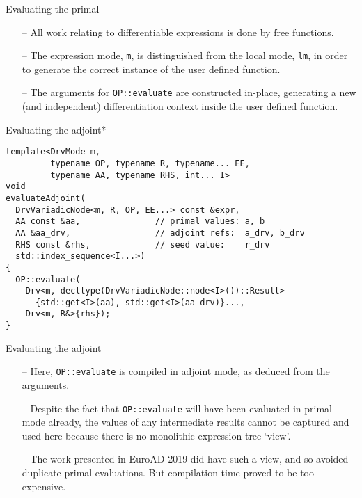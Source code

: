 \documentclass[xcolor=dvipsnames]{beamer}
\begin{document}
\begin{frame}[fragile]{Evaluating the primal}
\begin{itemize}
\item[--] All work relating to differentiable expressions is done by free functions.\vspace{3mm}
\item[--] The expression mode, \texttt{m}, is distinguished from the local mode, \texttt{lm}, in order to generate the correct instance of the user defined function. \vspace{3mm}
\item[--] The arguments for \texttt{OP::evaluate} are constructed in-place, generating a new (and independent) differentiation context inside the user defined function.  \vspace{3mm}
\end{itemize}
\end{frame}


\begin{frame}[fragile]{Evaluating the adjoint*}
\begin{lstlisting}
template<DrvMode m,
         typename OP, typename R, typename... EE,
         typename AA, typename RHS, int... I>
void
evaluateAdjoint(
  DrvVariadicNode<m, R, OP, EE...> const &expr,
  AA const &aa,               // primal values: a, b
  AA &aa_drv,                 // adjoint refs:  a_drv, b_drv
  RHS const &rhs,             // seed value:    r_drv
  std::index_sequence<I...>)
{
  OP::evaluate(
    Drv<m, decltype(DrvVariadicNode::node<I>())::Result>
      {std::get<I>(aa), std::get<I>(aa_drv)}...,
    Drv<m, R&>{rhs});
}
\end{lstlisting}
\end{frame}


\begin{frame}[fragile]{Evaluating the adjoint}
\begin{itemize}
\item[--] Here, \texttt{OP::evaluate} is compiled in adjoint mode, as deduced from the arguments.  \vspace{3mm}
\item[--] Despite the fact that \texttt{OP::evaluate} will have been evaluated in primal mode already, the values of any intermediate results cannot be captured and used here because there is no monolithic expression tree `view'. \vspace{3mm}
\item[--] The work presented in EuroAD 2019 did have such a view, and so avoided duplicate primal evaluations. But compilation time proved to be too expensive. \vspace{3mm}
\end{itemize}
\end{frame}
\end{document}
